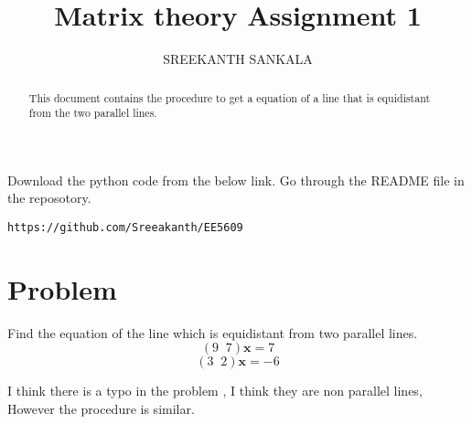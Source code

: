 \documentclass[journal,12pt,twocolumn]{IEEEtran}
\begin{document}
\makeatletter
{}
\makeatother
\let\StandardTheFigure\thefigure
\let\vec\mathbf
\renewcommand{\thefigure}{\theproblem}
\def\putbox#1#2#3{\makebox[0in][l]{\makebox[#1][l]{}\raisebox{\baselineskip}[0in][0in]{\raisebox{#2}[0in][0in]{#3}}}}
     \def\rightbox#1{\makebox[0in][r]{#1}}
     \def\centbox#1{\makebox[0in]{#1}}
     \def\topbox#1{\raisebox{-\baselineskip}[0in][0in]{#1}}
     \def\midbox#1{\raisebox{-0.5\baselineskip}[0in][0in]{#1}}
\vspace{3cm}
\title{Matrix theory Assignment 1}
\author{SREEKANTH SANKALA}

\maketitle
\newpage
\bigskip
\renewcommand{\thefigure}{\theenumi}
\renewcommand{\thetable}{\theenumi}

\begin{abstract}
This document contains the procedure to get a equation of a line that is equidistant from the two parallel lines.
\end{abstract}
Download the python code from the below link. Go through the README file in the reposotory.
%
\begin{lstlisting}
https://github.com/Sreeakanth/EE5609
\end{lstlisting}
%
\begin{comment}
and latex-tikz codes from 
%
\begin{lstlisting}
https://github.com/saipranavkr/EE5609
\end{lstlisting}
%
\end{comment}
\section{Problem}

Find the equation of the line which is equidistant from two parallel lines. 
\begin{equation}
    (9\;\;7)\textbf{x} = 7 
\end{equation}
\begin{equation}
    (3\;\;2)\textbf{x} = -6 
\end{equation}

I think there is a typo in the problem , I think they are non parallel lines, However the procedure is similar.
\end{document}
